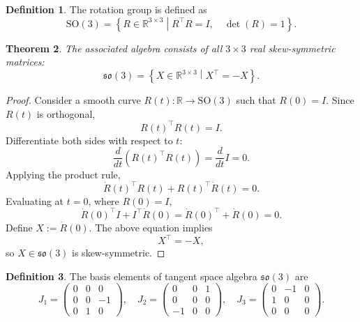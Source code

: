 \documentclass{amsart}
\newtheorem{theorem}{Theorem}[section]
\theoremstyle{definition}
\newtheorem{definition}[theorem]{Definition}
\theoremstyle{remark}
\begin{document}
\begin{definition}
  The rotation group is defined as
  \begin{equation*}
    \mathrm{SO}(3) = \left\{ R \in \mathbb{R}^{3 \times 3} \middle|
    R^\top R = I, \quad \det(R) = 1 \right\}.
  \end{equation*}
\end{definition}

\begin{theorem}\label{thm:so3_algebra_skew_symmetric}
  The associated algebra consists of all $3 \times 3$ real skew-symmetric matrices:
  \begin{equation*}
    \mathfrak{so}(3) = \left\{ X \in \mathbb{R}^{3 \times 3} \middle|
    X^\top = -X \right\}.
  \end{equation*}
\end{theorem}

\begin{proof}
  Consider a smooth curve $R(t): \mathbb{R} \to \mathrm{SO}(3)$ such that $R(0) = I$.
  Since $R(t)$ is orthogonal,
  \begin{equation*}
    R(t)^\top R(t) = I.
  \end{equation*}
  Differentiate both sides with respect to $t$:
  \begin{equation*}
    \frac{d}{dt} \left( R(t)^\top R(t) \right) = \frac{d}{dt} I = 0.
  \end{equation*}
  Applying the product rule,
  \begin{equation*}
    \dot{R}(t)^\top R(t) + R(t)^\top \dot{R}(t) = 0.
  \end{equation*}
  Evaluating at $t=0$, where $R(0) = I$,
  \begin{equation*}
    \dot{R}(0)^\top I + I^\top \dot{R}(0) = \dot{R}(0)^\top + \dot{R}(0) = 0.
  \end{equation*}
  Define $X := \dot{R}(0)$.
  The above equation implies
  \begin{equation*}
    X^\top = -X,
  \end{equation*}
  so $X \in \mathfrak{so}(3)$ is skew-symmetric.
\end{proof}

\begin{definition}
  The basis elements of tangent space algebra $\mathfrak{so}(3)$ are
  \begin{equation*}
    J_1 =
    \begin{pmatrix}
      0 & 0 & 0 \\
      0 & 0 & -1 \\
      0 & 1 & 0
    \end{pmatrix}, \quad
    J_2 =
    \begin{pmatrix}
      0 & 0 & 1 \\
      0 & 0 & 0 \\
      -1 & 0 & 0
    \end{pmatrix}, \quad
    J_3 =
    \begin{pmatrix}
      0 & -1 & 0 \\
      1 & 0 & 0 \\
      0 & 0 & 0
    \end{pmatrix}.
  \end{equation*}
\end{definition}
\end{document}
